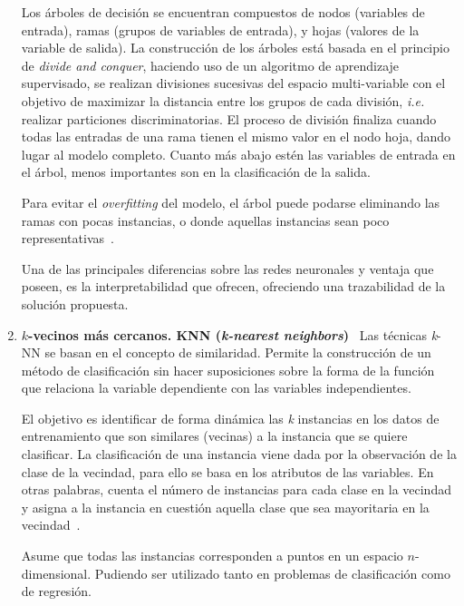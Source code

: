 \begin{enumerate}
	Los árboles de decisión se encuentran compuestos de nodos (variables de entrada), ramas (grupos de variables de entrada), y hojas (valores de la variable de salida). La construcción de los árboles está basada en el principio de \textit{divide and conquer}, haciendo uso de un algoritmo de aprendizaje supervisado, se realizan divisiones sucesivas del espacio multi-variable con el objetivo de maximizar la distancia entre los grupos de cada división, \textit{i.e.} realizar particiones discriminatorias. El proceso de división finaliza cuando todas las entradas de una rama tienen el mismo valor en el nodo hoja, dando lugar al modelo completo. Cuanto más abajo estén las variables de entrada en el árbol, menos importantes son en la clasificación  de la salida.
	
	Para evitar el \textit{overfitting} del modelo, el árbol puede podarse eliminando las ramas con pocas instancias, o donde aquellas instancias sean poco representativas~\cite{palmer2011data}.
	
	Una de las principales diferencias sobre las redes neuronales y ventaja que poseen, es la interpretabilidad que ofrecen, ofreciendo una trazabilidad de la solución propuesta.
	
	\item \textbf{$k$-vecinos más cercanos. KNN (\textit{k-nearest neighbors})}~\cite{guo2003knn,hand2007principles,palmer2011data} Las técnicas \textit{k}-NN se basan en el concepto de similaridad. Permite la construcción de un método de clasificación sin hacer suposiciones sobre la forma de la función que relaciona la variable dependiente con las variables independientes.
	
	El objetivo es identificar de forma dinámica las \textit{k} instancias en los datos de entrenamiento que son similares (vecinas) a la instancia que se quiere clasificar. La clasificación de una instancia viene dada por la observación de la clase de la vecindad, para ello se basa en los atributos de las variables. En otras palabras, cuenta el número de instancias para cada clase en la vecindad y asigna a la instancia en cuestión aquella clase que sea mayoritaria en la vecindad~\cite{potomac1999introduction}.
	
	Asume que todas las instancias corresponden a puntos en un espacio $n$-dimensional. Pudiendo ser utilizado tanto en problemas de clasificación como de regresión.
\end{enumerate}

